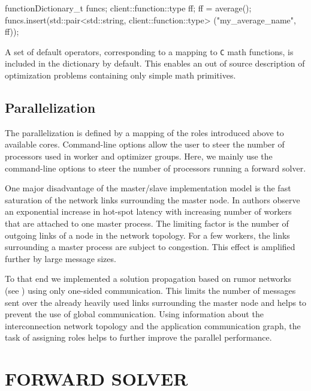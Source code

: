 \documentclass[preprint,linenumbers,amsmath,amssymb,aps,prstab]{revtex4-1}%
\begin{document}
\begin{code}
functionDictionary_t funcs;
client::function::type ff;
ff = average();
funcs.insert(std::pair<std::string, 
		client::function::type> 
       		("my_average_name", ff));
\end{code}

A set of default operators, corresponding to a mapping to \texttt{C} math
  functions, is included in the dictionary by default.
This enables an out of source description of optimization problems containing
  only simple math primitives.


\subsection{Parallelization} \label{sec:parallelization}

The parallelization is defined by a mapping of the roles introduced above to
  available cores.
Command-line options allow the user to steer the number of processors used in
  worker and optimizer groups.
Here, we mainly use the command-line options to steer the number of processors
  running a forward solver.

One major disadvantage of the master/slave implementation model is the fast
  saturation of the network links surrounding the master node.
In \cite{bctg:09} authors observe an exponential increase in hot-spot latency
  with increasing number of workers that are attached to one master process.
The limiting factor is the number of outgoing links of a node in the
  network topology. For a few workers, the links surrounding a
  master process are subject to congestion.
This effect is amplified further by large message sizes.

To that end we implemented a solution propagation based on rumor networks 
(see \cite{bgps:06,ayss:09}) using only one-sided communication.
This limits the number of messages sent over the already heavily used links
surrounding the master node and helps to prevent the use of
global communication. Using information about the interconnection network topology and the
application communication graph, the task of assigning roles helps to further
improve the parallel performance.



\section{FORWARD SOLVER} \label{sec:forward-solver}
\end{document}

